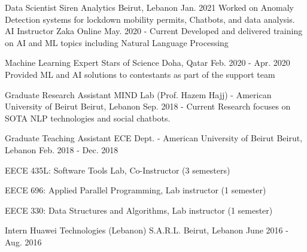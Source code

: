 

\begin{cventries}

  \cventry
    {Data Scientist} %
    {Siren Analytics} %
    {Beirut, Lebanon} %
    {Jan. 2021} %
    {Worked on Anomaly Detection systems for lockdown mobility permits, Chatbots, and data analysis.}
  \cventry
    {AI Instructor } %
    {Zaka} %
    {Online} %
    {May. 2020 - Current} %
    {Developed and delivered training on AI and ML topics including Natural Language Processing}

  \cventry
    {Machine Learning Expert} %
    {Stars of Science} %
    {Doha, Qatar} %
    {Feb. 2020 - Apr. 2020} %
    {Provided ML and AI solutions to contestants as part of the support team\smallskip}




  \cventry
    {Graduate Research Assistant} %
    {MIND Lab (Prof. Hazem Hajj) - American University of Beirut} %
    {Beirut, Lebanon} %
    {Sep. 2018 - Current} %
    {Research focuses on SOTA NLP technologies and social chatbots. }


  \cventry
    {Graduate Teaching Assistant} %
    {ECE Dept. - American University of Beirut} %
    {Beirut, Lebanon} %
    {Feb. 2018 - Dec. 2018} %
    { 
      \begin{cvitems} %
        \item {EECE 435L: Software Tools Lab, Co-Instructor (3 semesters)}
        \item {EECE 696: Applied Parallel Programming, Lab instructor (1 semester)}
        \item {EECE 330: Data Structures and Algorithms, Lab instructor (1 semester)}
      \end{cvitems}
    }

  \cventry
    {Intern} %
    {Huawei Technologies (Lebanon) S.A.R.L.} %
    {Beirut, Lebanon} %
    {June 2016  - Aug. 2016} %
    {}


\end{cventries}

